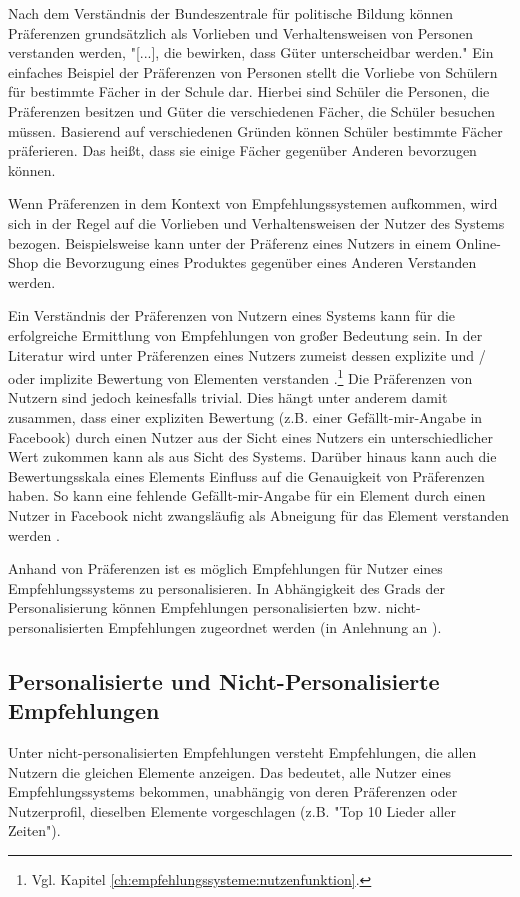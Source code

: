 Nach dem Verständnis der Bundeszentrale für politische Bildung können Präferenzen grundsätzlich als Vorlieben und Verhaltensweisen von Personen verstanden werden, "[...], die bewirken, dass Güter unterscheidbar werden."\cite{pollert:book}
Ein einfaches Beispiel der Präferenzen von Personen stellt die Vorliebe von Schülern für bestimmte Fächer in der Schule dar.
Hierbei sind Schüler die Personen, die Präferenzen besitzen und Güter die verschiedenen Fächer, die Schüler besuchen müssen.
Basierend auf verschiedenen Gründen können Schüler bestimmte Fächer präferieren.
Das heißt, dass sie einige Fächer gegenüber Anderen bevorzugen können.

Wenn Präferenzen in dem Kontext von Empfehlungssystemen aufkommen, wird sich in der Regel auf die Vorlieben und Verhaltensweisen der Nutzer des Systems bezogen.
Beispielsweise kann unter der Präferenz eines Nutzers in einem Online-Shop die Bevorzugung eines Produktes gegenüber eines Anderen Verstanden werden.

Ein Verständnis der Präferenzen von Nutzern eines Systems kann für die erfolgreiche Ermittlung von Empfehlungen von großer Bedeutung sein. %
In der Literatur wird unter Präferenzen eines Nutzers zumeist dessen explizite und / oder implizite Bewertung von Elementen verstanden \cite[S. 37]{berkovsky:2:article}\cite[S. 743]{adomavicius:inproceedings}\cite[S. 11]{recommenderSystems:2016}\cite[S. 129]{ekstrand:article}.\footnote{Vgl. Kapitel \ref{ch:empfehlungssysteme:nutzenfunktion}.}
Die Präferenzen von Nutzern sind jedoch keinesfalls trivial.
Dies hängt unter anderem damit zusammen, dass einer expliziten Bewertung (z.B. einer Gefällt-mir-Angabe in Facebook) durch einen Nutzer aus der Sicht eines Nutzers ein unterschiedlicher Wert zukommen kann als aus Sicht des Systems.
Darüber hinaus kann auch die Bewertungsskala eines Elements Einfluss auf die Genauigkeit von Präferenzen haben.
So kann eine fehlende Gefällt-mir-Angabe für ein Element durch einen Nutzer in Facebook nicht zwangsläufig als Abneigung für das Element verstanden werden \cite[S. 11]{recommenderSystems:2016}.

Anhand von Präferenzen ist es möglich Empfehlungen für Nutzer eines Empfehlungssystems zu personalisieren.
In Abhängigkeit des Grads der Personalisierung können Empfehlungen personalisierten bzw. nicht-personalisierten Empfehlungen zugeordnet werden (in Anlehnung an \cite[S. 400]{unternährer:article}).

\subsection{Personalisierte und Nicht-Personalisierte Empfehlungen}
Unter nicht-personalisierten Empfehlungen versteht \textcite[S. 400]{unternährer:article} Empfehlungen, die allen Nutzern die gleichen Elemente anzeigen.
Das bedeutet, alle Nutzer eines Empfehlungssystems bekommen, unabhängig von deren Präferenzen oder Nutzerprofil, dieselben Elemente vorgeschlagen (z.B. "Top 10 Lieder aller Zeiten").

